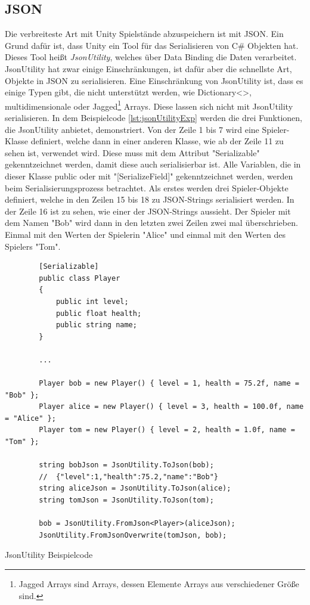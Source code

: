 \subsection{JSON}
Die verbreiteste Art mit Unity Spielstände abzuspeichern ist mit JSON. Ein Grund dafür ist, dass Unity ein Tool für das Serialisieren von C\# Objekten hat. Dieses Tool heißt \textit{JsonUtility}, welches über Data Binding die Daten verarbeitet. JsonUtility hat zwar einige Einschränkungen, ist dafür aber die schnellste Art, Objekte in JSON zu serialisieren. Eine Einschränkung von JsonUtility ist, dass es einige Typen gibt, die nicht unterstützt werden, wie Dictionary<>, multidimensionale oder Jagged\footnote{Jagged Arrays sind Arrays, dessen Elemente Arrays aus verschiedener Größe sind.\cite{microsoftVerzweigteArrays}} Arrays. Diese lassen sich nicht mit JsonUtility serialisieren. In dem Beispielcode \ref{lst:jsonUtilityExp} werden die drei Funktionen, die JsonUtility anbietet, demonstriert. Von der Zeile 1 bis 7 wird eine Spieler-Klasse definiert, welche dann in einer anderen Klasse, wie ab der Zeile 11 zu sehen ist, verwendet wird. Diese muss mit dem Attribut "Serializable" gekenntzeichnet werden, damit diese auch serialisierbar ist. Alle Variablen, die in dieser Klasse public oder mit "[SerializeField]" gekenntzeichnet werden, werden beim Serialisierungsprozess betrachtet. Als erstes werden drei Spieler-Objekte definiert, welche in den Zeilen 15 bis 18 zu JSON-Strings serialisiert werden. In der Zeile 16 ist zu sehen, wie einer der JSON-Strings aussieht. Der Spieler mit dem Namen "Bob" wird dann in den letzten zwei Zeilen zwei mal überschrieben. Einmal mit den Werten der Spielerin "Alice" und einmal mit den Werten des Spielers "Tom". 
\cite{unityJsonUtility}\cite{unitySerializationRules} 
\begin{listing}[htp]
    \begin{verbatim} 
        [Serializable]
        public class Player
        {
            public int level;
            public float health;
            public string name;
        }

        ...
        
        Player bob = new Player() { level = 1, health = 75.2f, name = "Bob" };
        Player alice = new Player() { level = 3, health = 100.0f, name = "Alice" };
        Player tom = new Player() { level = 2, health = 1.0f, name = "Tom" };

        string bobJson = JsonUtility.ToJson(bob);
        //  {"level":1,"health":75.2,"name":"Bob"}
        string aliceJson = JsonUtility.ToJson(alice);
        string tomJson = JsonUtility.ToJson(tom);

        bob = JsonUtility.FromJson<Player>(aliceJson);
        JsonUtility.FromJsonOverwrite(tomJson, bob);
    \end{verbatim}
    \caption{JsonUtility Beispielcode}
    \label{lst:jsonUtilityExp}
\end{listing}

